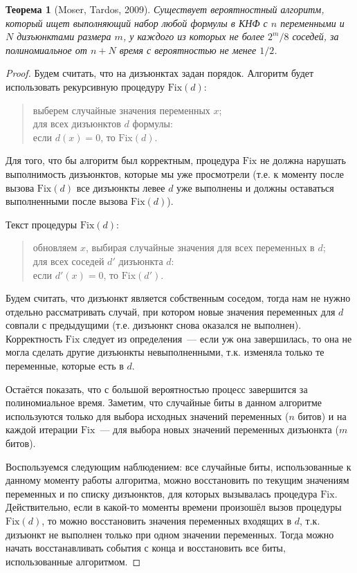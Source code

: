 \documentclass[12pt]{article}
\theoremstyle{definition}
\theoremstyle{plain}
\newtheorem{theorem}{Теорема}[section]
\theoremstyle{remark}
\begin{document}
\begin{theorem}[Moser, Tardos, 2009]
    Существует вероятностный алгоритм, который ищет выполняющий набор любой формулы в 
    КНФ с $n$ переменными и $N$ дизъюнктами размера $m$, у каждого из которых не более $2^m/8$
    соседей, за полиномиальное от $n+N$ время с вероятностью не менее $1/2$.
\end{theorem}
\begin{proof} Будем считать, что на дизъюнктах задан порядок.
    Алгоритм будет использовать рекурсивную процедуру $\mathrm{Fix}(d)$:
    \begin{quote}
        выберем случайные значения переменных $x$;\\
        для всех дизъюнктов $d$ формулы:\\
        \mbox{}\quad если $d(x) = 0$, то $\mathrm{Fix}(d)$.
    \end{quote}
    Для того, что бы алгоритм был корректным, процедура $\mathrm{Fix}$
    не должна нарушать выполнимость дизъюнктов, которые мы уже просмотрели
    (т.е. к моменту после вызова $\mathrm{Fix}(d)$ все дизъюнкты левее $d$ уже
    выполнены и должны оставаться выполненными после вызова $\mathrm{Fix}(d)$).
    
    Текст процедуры $\mathrm{Fix}(d)$:
    \begin{quote}
        обновляем $x$, выбирая случайные значения для всех переменных в $d$;\\
        для всех соседей $d'$ дизъюнкта $d$:\\
        \mbox{}\quad если $d'(x) = 0$, то $\mathrm{Fix}(d')$.
    \end{quote}
    Будем считать, что дизъюнкт является собственным соседом, тогда нам не нужно
    отдельно рассматривать случай, при котором новые значения переменных для $d$
    совпали с предыдущими (т.е. дизъюнкт снова оказался не выполнен).  
    Корректность $\mathrm{Fix}$ следует из определения~--- если уж она завершилась,
    то она не могла сделать другие дизъюнкты невыполненными, т.к. изменяла
    только те переменные, которые есть в $d$.
    
    Остаётся показать, что с большой вероятностью процесс завершится за полиномиальное время.
    Заметим, что случайные биты в данном алгоритме используются только для выбора исходных 
    значений переменных ($n$ битов) и на каждой итерации $\mathrm{Fix}$~--- для выбора новых 
    значений переменных дизъюнкта ($m$ битов). 
   
    Воспользуемся следующим наблюдением: все случайные биты, использованные к данному
    моменту работы алгоритма, можно восстановить по текущим значениям переменных и
    по списку дизъюнктов, для которых вызывалась процедура $\mathrm{Fix}$. Действительно,
    если в какой-то моменты времени произошёл вызов процедуры $\mathrm{Fix}(d)$,
    то можно восстановить значения переменных входящих в $d$, т.к. дизъюнкт не выполнен
    только при одном значении переменных. Тогда можно начать восстанавливать события
    с конца и восстановить все биты, использованные алгоритмом.


\end{proof}
\end{document}
